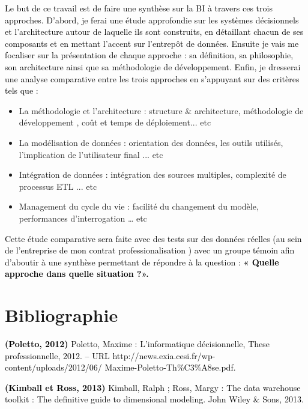 \documentclass[a4paper,12pt]{report}
\begin{document}
\textcolor{black}{Le but de ce travail est de faire une synthèse sur la BI à travers ces trois approches. D’abord, je ferai une étude approfondie sur les systèmes décisionnels et l’architecture autour de laquelle ils sont construits, en détaillant chacun de ses composants et en mettant l’accent sur l’entrepôt de données. Ensuite je vais me focaliser sur la présentation de chaque approche : sa définition, sa philosophie, son architecture ainsi que sa méthodologie de développement. Enfin, je dresserai une analyse comparative entre les trois approches en s’appuyant sur des critères tels que :}

\begin{itemize}
	\item La méthodologie et l'architecture : structure \& architecture, méthodologie de développement , coût et temps de déploiement... etc
	\item La modélisation de données : orientation des données, les outils utilisés, l'implication de l'utilisateur final ... etc 
	\item Intégration de données : intégration des sources multiples, complexité de processus ETL ... etc
	\item Management du cycle du vie : facilité du changement du modèle, performances d'interrogation … etc
	
	
\end{itemize}



\textcolor{black}{ Cette étude comparative sera faite avec des tests sur des données réelles (au sein de l'entreprise de mon contrat professionalisation ) avec un groupe témoin afin d’aboutir à une synthèse permettant de répondre à la question :  \textbf{ « Quelle approche dans quelle situation ?».}}
\\
	
\vspace{1cm}
\section*{Bibliographie}
\vspace{1cm}

	\item[] \textcolor{black}{
\textbf{(Poletto, 2012)} Poletto, Maxime : L’informatique décisionnelle, These professionnelle, 2012. – URL http://news.exia.cesi.fr/wp-content/uploads/2012/06/
Maxime-Poletto-Th\%C3\%A8se.pdf.}
\\

	\item[] \textcolor{black}{
\textbf{(Kimball et Ross, 2013)} Kimball, Ralph ; Ross, Margy : The data warehouse toolkit : The definitive guide to dimensional modeling. John Wiley \& Sons, 2013.	
}
\\
\end{document}
